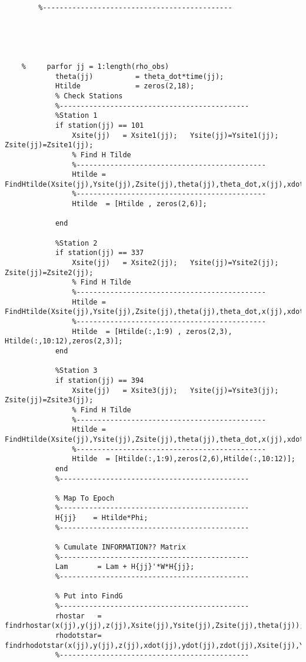 \documentclass[12pt,a4paper,oneside]{article}
\numberwithin{equation}{section}   		%
\begin{document}
\begin{appendices}
\begin{lstlisting}
	    %---------------------------------------------
	
	
	    
	    
	    
	%     parfor jj = 1:length(rho_obs)
	        theta(jj)          = theta_dot*time(jj);
	        Htilde             = zeros(2,18);
	        % Check Stations
	        %---------------------------------------------
	        %Station 1
	        if station(jj) == 101
	            Xsite(jj)   = Xsite1(jj);   Ysite(jj)=Ysite1(jj);   Zsite(jj)=Zsite1(jj);
	            % Find H Tilde
	            %---------------------------------------------
	            Htilde = FindHtilde(Xsite(jj),Ysite(jj),Zsite(jj),theta(jj),theta_dot,x(jj),xdot(jj),y(jj),ydot(jj),z(jj),zdot(jj));
	            %---------------------------------------------
	            Htilde  = [Htilde , zeros(2,6)];
	            
	        end
	
	        %Station 2
	        if station(jj) == 337
	            Xsite(jj)   = Xsite2(jj);   Ysite(jj)=Ysite2(jj);   Zsite(jj)=Zsite2(jj);
	            % Find H Tilde
	            %---------------------------------------------
	            Htilde = FindHtilde(Xsite(jj),Ysite(jj),Zsite(jj),theta(jj),theta_dot,x(jj),xdot(jj),y(jj),ydot(jj),z(jj),zdot(jj));
	            %---------------------------------------------
	            Htilde  = [Htilde(:,1:9) , zeros(2,3), Htilde(:,10:12),zeros(2,3)];
	        end
	
	        %Station 3
	        if station(jj) == 394
	            Xsite(jj)   = Xsite3(jj);   Ysite(jj)=Ysite3(jj);   Zsite(jj)=Zsite3(jj);
	            % Find H Tilde
	            %---------------------------------------------
	            Htilde = FindHtilde(Xsite(jj),Ysite(jj),Zsite(jj),theta(jj),theta_dot,x(jj),xdot(jj),y(jj),ydot(jj),z(jj),zdot(jj));
	            %---------------------------------------------
	            Htilde  = [Htilde(:,1:9),zeros(2,6),Htilde(:,10:12)];
	        end
	        %---------------------------------------------
	       
	        % Map To Epoch
	        %---------------------------------------------
	        H{jj}    = Htilde*Phi;
	        %---------------------------------------------
	        
	        % Cumulate INFORMATION?? Matrix
	        %---------------------------------------------
	        Lam       = Lam + H{jj}'*W*H{jj};
	        %---------------------------------------------
	        
	        % Put into FindG
	        %---------------------------------------------
	        rhostar   = findrhostar(x(jj),y(jj),z(jj),Xsite(jj),Ysite(jj),Zsite(jj),theta(jj));
	        rhodotstar= findrhodotstar(x(jj),y(jj),z(jj),xdot(jj),ydot(jj),zdot(jj),Xsite(jj),Ysite(jj),Zsite(jj),theta(jj),theta_dot,rhostar);
	        %---------------------------------------------
	        

\end{lstlisting}
\end{appendices}
\end{document}

